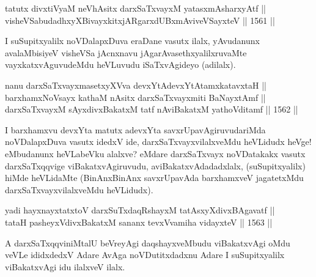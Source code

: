 \begin{shl}
\footnotemark[1]tatutx divxtiVyaM neVhAsitx darxSaTxvayxM yatasxmAsharxyAtf || \\
visheVSabudadhxyXBivayxkitxjARgarxdUBxmAviveVSayxteV ||  1561 ||
\end{shl}

\begin{artha}
I suSupitxyalilx noVDalapxDuva eraDane vasutx ilalx, yAvudanunx avalaMbisiyeV visheVSa jAcnxnavu jAgarAvasethxyalilxruvaMte vayxkatxvAguvudeMdu heVLuvudu iSaTxvAgideyo (adilalx).
\end{artha}


\begin{shl}
nanu darxSaTxvayxmasetxyXVva devxYtAdevxYtAtamxkatavxtaH || \\
barxhamxNoV\s sayx kathaM nAsitx darxSaTxvayxmiti BaNayxtAmf || \\
\footnotemark[2]darxSaTxvayxM sAyxdivxBakatxM tatf nAviBakatxM yathoVditamf ||  1562 ||  
\end{shl}

\begin{artha}
I barxhamxvu devxYta matutx adevxYta savxrUpavAgiruvudariMda noVDalapxDuva vasutx idedxV ide, darxSaTxvayxvilalxveMdu heVLidudx heVge! eMbudanunx heVLabeVku alalxve? eMdare darxSaTxvayx noVDatakakx vasutx darxSaTxqqvige viBakatxvAgiruvudu, aviBakatxvAdadadxlalx, (suSupitxyalilx) hiMde heVLidaMte (BinAnxBinAnx savxrUpavAda barxhamxveV jagatetxMdu darxSaTxvayxvilalxveMdu heVLidudx).
\end{artha}

\begin{shl}
yadi hayxnayxtatxtoV darxSuTxdaqRshayxM tatAsxyXdivxBAgavatf ||\\
tataH pasheyxVdivxBakatxM sananx tevxVvamiha vidayxteV ||  1563 ||  
\end{shl}

\begin{artha}
A darxSaTxqqviniMtalU beVreyAgi daqshayxveMbudu viBakatxvAgi oMdu veVLe ididxdedxV Adare AvAga noVDutitxdadxnu Adare I suSupitxyalilx viBakatxvAgi idu ilalxveV ilalx.
\end{artha}

